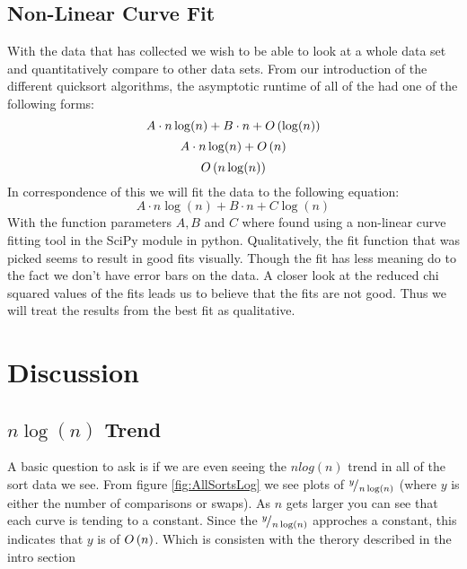 	\subsection{Non-Linear Curve Fit}
		\label{subsec:CurveFit}

		With the data that has collected we wish to be able to look at a whole data set and quantitatively compare
		to other data sets. From our introduction of the different quicksort algorithms,
		the asymptotic runtime of all of the had one of the following forms:
		\begin{equation}
			A\cdot n\log(n) + B\cdot n + O\left(\log(n)\right)
		\end{equation}
		\begin{equation}
			A\cdot n\log(n) + O\left(n\right)
		\end{equation}
		\begin{equation}
			O\left(n\log(n)\right)
		\end{equation}
		In correspondence of this we will fit the data to the following equation:
		\begin{equation}
			A\cdot n\log(n) + B\cdot n + C\log(n)
			\label{eq:FitFunction}
		\end{equation}
		With the function parameters $A,B$ and $C$ where found using a non-linear curve fitting tool in the SciPy module in python.
		Qualitatively, the fit function that was picked seems to result in good fits visually.
		Though the fit has less meaning do to the fact we don't have error bars on the data.
		A closer look at the reduced chi squared values of the fits leads us to believe that the fits are not good.\cite{bevington1969data}
		Thus we will treat the results from the best fit as qualitative.
		

\section{Discussion}
	\label{sec:Discussion}
	\subsection{$n\log(n)$ Trend}
		
		A basic question to ask is if we are even seeing the $n log(n)$ trend in all of the sort data we see.
		From figure \ref{fig:AllSortsLog} we see plots of ${}^{y}\!/_{n \log(n)}$ 
		(where $y$ is either the number of comparisons or swaps).
		As $n$ gets larger you can see that each curve is tending to a constant.
		Since the ${}^{y}\!/_{n \log(n)}$ approches a constant, this indicates that
		$y$ is of $O\left(n\right)$. Which is consisten with the therory described in the intro section
		

